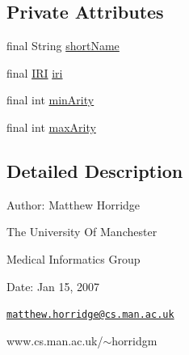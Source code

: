 \subsection*{Private Attributes}
\begin{DoxyCompactItemize}
\item 
final String \hyperlink{enumorg_1_1semanticweb_1_1owlapi_1_1vocab_1_1_s_w_r_l_built_ins_vocabulary_a7bf725a059e8c250441b527d9f12d044}{short\-Name}
\item 
final \hyperlink{classorg_1_1semanticweb_1_1owlapi_1_1model_1_1_i_r_i}{I\-R\-I} \hyperlink{enumorg_1_1semanticweb_1_1owlapi_1_1vocab_1_1_s_w_r_l_built_ins_vocabulary_a7ecad479b8fec19ac570fa6f8710efd3}{iri}
\item 
final int \hyperlink{enumorg_1_1semanticweb_1_1owlapi_1_1vocab_1_1_s_w_r_l_built_ins_vocabulary_a8a82960bde04f8eb5e5fc1892d30f8fb}{min\-Arity}
\item 
final int \hyperlink{enumorg_1_1semanticweb_1_1owlapi_1_1vocab_1_1_s_w_r_l_built_ins_vocabulary_afcd23aa29c595c24beca57f1db5d0214}{max\-Arity}
\end{DoxyCompactItemize}


\subsection{Detailed Description}
Author\-: Matthew Horridge\par
 The University Of Manchester\par
 Medical Informatics Group\par
 Date\-: Jan 15, 2007\par
\par
 

\href{mailto:matthew.horridge@cs.man.ac.uk}{\tt matthew.\-horridge@cs.\-man.\-ac.\-uk}\par
 www.\-cs.\-man.\-ac.\-uk/$\sim$horridgm\par
\par
 


